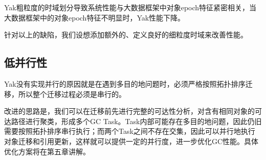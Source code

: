 Yak粗粒度的时域划分导致系统性能与大数据框架中对象epoch特征紧密相关，当大数据框架中的对象epoch特征不明显时，Yak性能下降。

针对以上的缺陷，我们设想添加额外的、定义良好的细粒度时域来改善性能。

\subsection{低并行性}

Yak没有实现并行的原因就是在遇到多目的地问题时，必须严格按照拓扑排序迁移，所以整个迁移过程必须是串行的。

改进的思路是，我们可以在迁移前先进行完整的可达性分析，对含有相同对象的可达路径进行聚类，形成多个GC Task。Task内部可能存在多目的地问题，因此仍旧需要按照拓扑排序串行执行；而两个Task之间不存在交集，因此可以并行地执行对象迁移和引用更新，这样就可以提供一定的并行度，进一步优化GC性能。具体优化方案将在第五章讲解。

